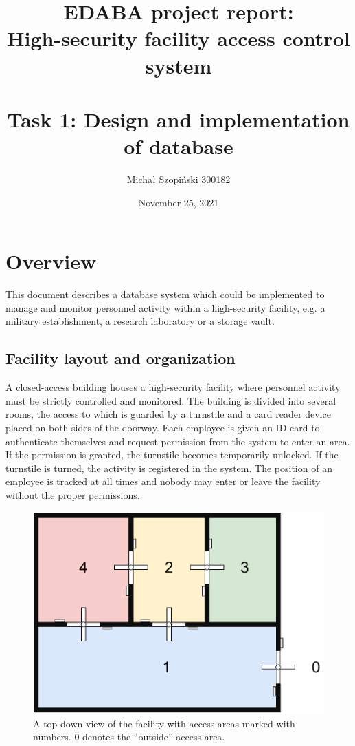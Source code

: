 \documentclass{article}
\begin{document}
	
	\title{EDABA project report:\\
	High-security facility access control system\\~\\
	\large Task 1: Design and implementation of database}
	\author{Michał Szopiński 300182}
	\date{November 25, 2021}
	\maketitle

	\section{Overview}
	
	This document describes a database system which could be implemented to
	manage and monitor personnel activity within a high-security facility,
	e.g. a military establishment, a research laboratory or a storage vault.
	
	\subsection{Facility layout and organization}
	
	A closed-access building houses a high-security facility where personnel
	activity must be strictly controlled and monitored. The building is divided
	into several rooms, the access to which is guarded by a turnstile and a
	card reader device placed on both sides of the doorway. Each employee is
	given an ID card to authenticate themselves and request permission from the
	system to enter an area. If the permission is granted, the turnstile
	becomes temporarily unlocked. If the turnstile is turned, the activity is
	registered in the system. The position of an employee is tracked at all
	times and nobody may enter or leave the facility without the proper
	permissions.
	
	\clearpage
	\begin{figure}[h]		
		\begin{center}
			\includegraphics[width=1\linewidth]{facility}
			\caption{A top-down view of the facility with access areas marked
			with numbers. 0 denotes the ``outside'' access area.}
		\end{center}
	\end{figure}
	
\end{document}
